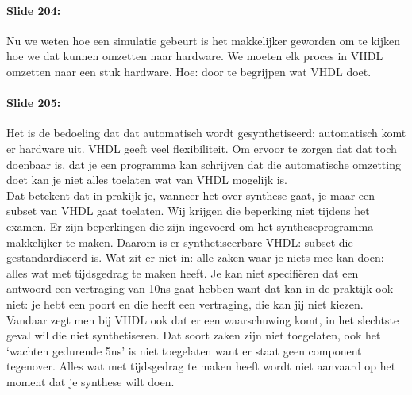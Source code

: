 \documentclass[10pt,a4paper]{book}
\begin{document}
\paragraph{Slide 204:} Nu we weten hoe een simulatie gebeurt is het makkelijker geworden om te kijken hoe we dat kunnen omzetten naar hardware. We moeten elk proces in VHDL omzetten naar een stuk hardware. Hoe: door te begrijpen wat VHDL doet. 

\paragraph{Slide 205:} Het is de bedoeling dat dat automatisch wordt gesynthetiseerd: automatisch komt er hardware uit. VHDL geeft veel flexibiliteit. Om ervoor te zorgen dat dat toch doenbaar is, dat je een programma kan schrijven dat die automatische omzetting doet kan je niet alles toelaten wat van VHDL mogelijk is.\\
Dat betekent dat in prakijk je, wanneer het over synthese gaat, je maar een subset van VHDL gaat toelaten. Wij krijgen die beperking niet tijdens het examen. Er zijn beperkingen die zijn ingevoerd om het syntheseprogramma makkelijker te maken. Daarom is er synthetiseerbare VHDL: subset die gestandardiseerd is. Wat zit er niet in: alle zaken waar je niets mee kan doen: alles wat met tijdsgedrag te maken heeft. Je kan niet specifi\"eren dat een antwoord een vertraging van 10ns gaat hebben want dat kan in de praktijk ook niet: je hebt een poort en die heeft een vertraging, die kan jij niet kiezen. Vandaar zegt men bij VHDL ook dat er een waarschuwing komt, in het slechtste geval wil die niet synthetiseren. Dat soort zaken zijn niet toegelaten, ook het `wachten gedurende 5ns' is niet toegelaten want er staat geen component tegenover. Alles wat met tijdsgedrag te maken heeft wordt niet aanvaard op het moment dat je synthese wilt doen.
\end{document}
